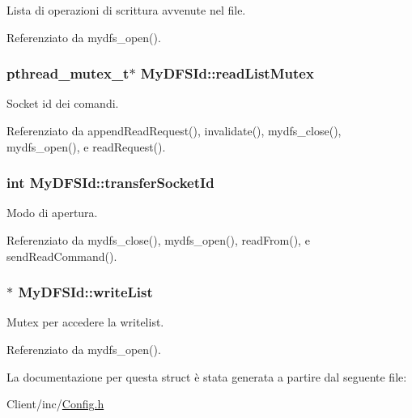 Lista di operazioni di scrittura avvenute nel file. 



Referenziato da mydfs\+\_\+open().

\hypertarget{structMyDFSId_a71f51c82d7133bfc16fcffeb4c395da0}{
\subsubsection[{read\+List\+Mutex}]{\setlength{\rightskip}{0pt plus 5cm}pthread\+\_\+mutex\+\_\+t$\ast$ My\+D\+F\+S\+Id\+::read\+List\+Mutex}}\label{structMyDFSId_a71f51c82d7133bfc16fcffeb4c395da0}


Socket id dei comandi. 



Referenziato da append\+Read\+Request(), invalidate(), mydfs\+\_\+close(), mydfs\+\_\+open(), e read\+Request().

\hypertarget{structMyDFSId_a8d5f597502e29e2edc6d2f46c2323b1d}{
\subsubsection[{transfer\+Socket\+Id}]{\setlength{\rightskip}{0pt plus 5cm}int My\+D\+F\+S\+Id\+::transfer\+Socket\+Id}}\label{structMyDFSId_a8d5f597502e29e2edc6d2f46c2323b1d}


Modo di apertura. 



Referenziato da mydfs\+\_\+close(), mydfs\+\_\+open(), read\+From(), e send\+Read\+Command().

\hypertarget{structMyDFSId_a0f7d2a9c60ddc649ee7e65b8b9295432}{
\subsubsection[{write\+List}]{$\ast$ My\+D\+F\+S\+Id\+::write\+List}}\label{structMyDFSId_a0f7d2a9c60ddc649ee7e65b8b9295432}


Mutex per accedere la writelist. 



Referenziato da mydfs\+\_\+open().



La documentazione per questa struct è stata generata a partire dal seguente file\+:\begin{DoxyCompactItemize}
\item 
Client/inc/\hyperlink{Client_2inc_2Config_8h}{Config.\+h}\end{DoxyCompactItemize}
